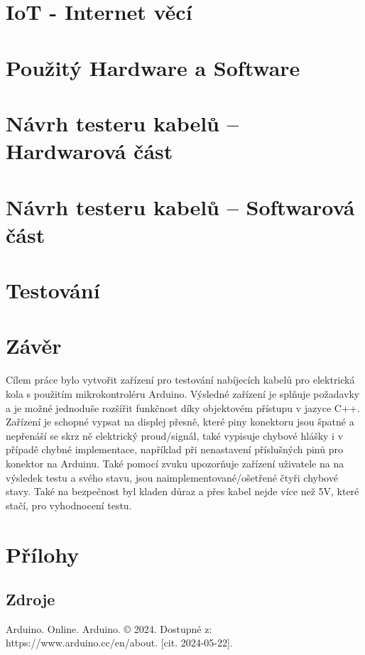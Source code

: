 \documentclass[12pt,a4paper,titlepage]{scrreprt}
\begin{document}
	\chapter{IoT - Internet věcí}
	
	
	
	
	\chapter{Použitý Hardware a Software}
	
	
	
	
	
	
	\chapter{Návrh testeru kabelů – Hardwarová část}
	
	
	\chapter{Návrh testeru kabelů – Softwarová část}
	
	
	
	
	\chapter{Testování}
	
	
	
	\chapter{Závěr}
	Cílem práce bylo vytvořit zařízení pro testování nabíjecích kabelů pro elektrická kola s použitím mikrokontroléru Arduino. Výsledné zařízení je splňuje požadavky a je možné jednoduše rozšířit funkčnost díky objektovém přístupu v jazyce C++. Zařízení je schopné vypsat na displej přesně, které piny konektoru jsou špatné a nepřenáší se skrz ně elektrický proud/signál, také vypisuje chybové hlášky i v případě chybné implementace, například při nenastavení příslušných pinů pro konektor na Arduinu. Také pomocí zvuku upozorňuje zařízení uživatele na na výsledek testu a svého stavu, jsou naimplementované/ošetřené čtyři chybové stavy. Také na bezpečnost byl kladen důraz a přes kabel nejde více než 5V, které stačí, pro vyhodnocení testu.

	\newpage
	\chapter{Přílohy}
	\section*{Zdroje}
	Arduino. Online. Arduino. © 2024. Dostupné z: https://www.arduino.cc/en/about. [cit. 2024-05-22].
	
\end{document}
